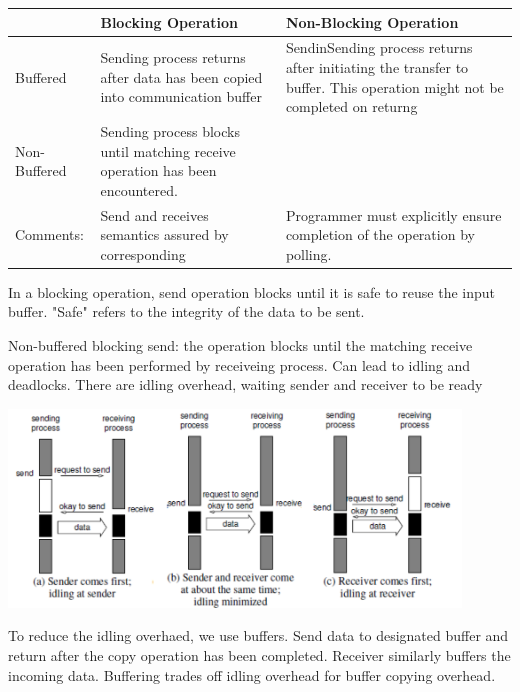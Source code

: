 \documentclass{article}
\begin{document}
\begin{tabularx}{0.8\textwidth} {
        | >{\raggedright\arraybackslash}X
        | >{\centering\arraybackslash}X
        | >{\raggedleft\arraybackslash}X |}
    \hline
                 & Blocking Operation                                                            & Non-Blocking Operation                                                                                                  \\
    \hline
    Buffered     & Sending process returns after data has been copied into communication buffer  & SendinSending process returns after initiating the transfer to buffer. This operation might not be completed on returng \\
    \hline
    Non-Buffered & Sending process blocks until matching receive operation has been encountered. &                                                                                                                         \\
    \hline
    Comments:    & Send and receives semantics assured by corresponding                          & Programmer must explicitly ensure completion of the operation by polling.                                               \\
    \hline
\end{tabularx}

In a blocking operation, send operation blocks until it is safe to reuse the input buffer.
"Safe" refers to the integrity of the data to be sent.

Non-buffered blocking send:
the operation blocks until the matching receive operation has been performed by receiveing process.
Can lead to idling and deadlocks.
There are idling overhead, waiting sender and receiver to be ready

\includegraphics[width=0.9\textwidth]{l8_non_buffered_blocking.png}

To reduce the idling overhaed, we use buffers.
Send data to designated buffer and return after the copy operation has been completed.
Receiver similarly buffers the incoming data.
Buffering trades off idling overhead for buffer copying overhead.
\end{document}
